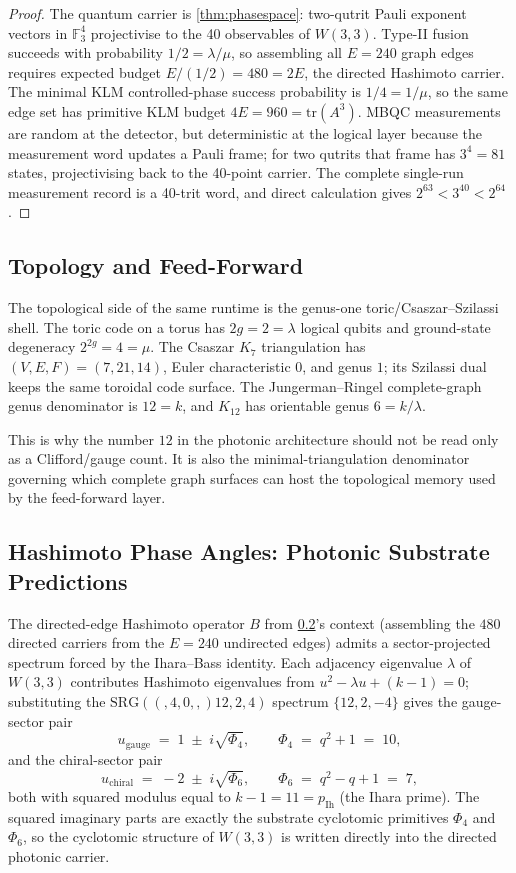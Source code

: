 ﻿\documentclass[12pt]{article}
\newcommand{\SRG}[4]{\mathrm{SRG}(#1,#2,#3,#4)}
\newcommand{\GF}[1]{\mathbb{F}_{#1}}
\begin{document}
\begin{proof}
The quantum carrier is \cref{thm:phasespace}: two-qutrit Pauli exponent vectors in
$\GF{3}^{4}$ projectivise to the 40 observables of $W(3,3)$.  Type-II fusion
succeeds with probability $1/2=\lambda/\mu$, so assembling all $E=240$ graph edges
requires expected budget $E/(1/2)=480=2E$, the directed Hashimoto carrier.  The
minimal KLM controlled-phase success probability is $1/4=1/\mu$, so the same edge
set has primitive KLM budget $4E=960=\mathrm{tr}(A^3)$.  MBQC measurements are
random at the detector, but deterministic at the logical layer because the
measurement word updates a Pauli frame; for two qutrits that frame has $3^4=81$
states, projectivising back to the 40-point carrier.  The complete single-run
measurement record is a 40-trit word, and direct calculation gives
$2^{63}<3^{40}<2^{64}$.
\end{proof}

\subsection{Topology and Feed-Forward}

The topological side of the same runtime is the genus-one toric/Csaszar--Szilassi
shell.  The toric code on a torus has $2g=2=\lambda$ logical qubits and ground-state
degeneracy $2^{2g}=4=\mu$.  The Csaszar $K_7$ triangulation has
$(V,E,F)=(7,21,14)$, Euler characteristic $0$, and genus $1$; its Szilassi dual
keeps the same toroidal code surface.  The Jungerman--Ringel complete-graph genus
denominator is $12=k$, and $K_{12}$ has orientable genus $6=k/\lambda$.

This is why the number $12$ in the photonic architecture should not be read only as
a Clifford/gauge count.  It is also the minimal-triangulation denominator governing
which complete graph surfaces can host the topological memory used by the
feed-forward layer.

\subsection{Hashimoto Phase Angles: Photonic Substrate Predictions}
\label{sec:hashimoto-phases}

The directed-edge Hashimoto operator $B$ from \cref{sec:hashimoto-phases}'s
context (assembling the $480$ directed carriers from the $E = 240$ undirected
edges) admits a sector-projected spectrum forced by the Ihara--Bass identity.
Each adjacency eigenvalue $\lambda$ of $W(3,3)$ contributes Hashimoto
eigenvalues from $u^2 - \lambda u + (k-1) = 0$; substituting the
$\SRG(40,12,2,4)$ spectrum $\{12, 2, -4\}$ gives the gauge-sector pair
\[
u_{\mathrm{gauge}} \;=\; 1 \;\pm\; i\sqrt{\Phi_4},
\qquad
\Phi_4 \;=\; q^2 + 1 \;=\; 10,
\]
and the chiral-sector pair
\[
u_{\mathrm{chiral}} \;=\; -2 \;\pm\; i\sqrt{\Phi_6},
\qquad
\Phi_6 \;=\; q^2 - q + 1 \;=\; 7,
\]
both with squared modulus equal to $k - 1 = 11 = p_{\mathrm{Ih}}$ (the
Ihara prime).  The squared imaginary parts are exactly the substrate
cyclotomic primitives $\Phi_4$ and $\Phi_6$, so the cyclotomic structure
of $W(3,3)$ is written directly into the directed photonic carrier.
\end{document}
